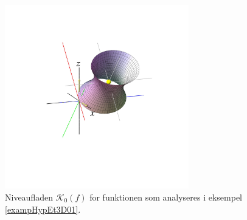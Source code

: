 \begin{figure}[ht]
\centerline{  \includegraphics[height=80mm]{FIGS/plotHypEt3D01Kvad.pdf}}
\begin{center}
\caption{Niveaufladen $\mathcal{K}_{0}(f)$ for funktionen som analyseres i eksempel \ref{exampHypEt3D01}.} \label{figHypEt3D01Kvad}
\end{center}
\end{figure}








